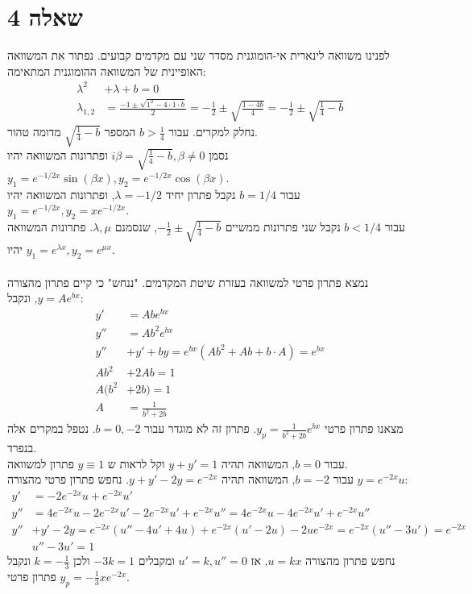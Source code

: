 \documentclass{article}
\begin{document}
\section*{שאלה 4}
לפנינו משוואה לינארית אי-הומוגנית מסדר שני עם מקדמים קבועים. נפתור את המשוואה האופיינית של המשוואה ההומוגנית המתאימה:
\begin{align*}
    \lambda^2     & +\lambda+b  =0                                                                                                           \\
    \lambda_{1,2} & =\frac{-1\pm\sqrt{1^2-4\cdot 1 \cdot b}}{2}=-\frac{1}{2}\pm \sqrt{\frac{1-4b}{4}} = -\frac{1}{2}\pm \sqrt{\frac{1}{4}-b}
\end{align*}
נחלק למקרים. עבור $b>\frac{1}{4}$ המספר $\sqrt{\frac{1}{4}-b}$ מדומה טהור. \\
נסמן $i\beta=\sqrt{\frac{1}{4}-b}, \beta\ne 0$ ופתרונות המשוואה יהיו $y_1=e^{-1/2x}\sin (\beta x), y_2=e^{-1/2x}\cos(\beta x)$. \\
עבור $b=1/4$ נקבל פתרון יחיד $\lambda=-1/2$, ופתרונות המשוואה יהיו $y_1=e^{-1/2x}, y_2=xe^{-1/2x}$. \\
עבור $b<1/4$ נקבל שני פתרונות ממשיים $-\frac{1}{2}\pm \sqrt{\frac{1}{4}-b}$, שנסמנם $\lambda, \mu$. פתרונות המשוואה יהיו $y_1=e^{\lambda x}, y_2=e^{\mu x}$.\\\\
נמצא פתרון פרטי למשוואה בעזרת שיטת המקדמים. "ננחש" כי קיים פתרון מהצורה $y=Ae^{bx}$, ונקבל:
\begin{align*}
    y'    & =Abe^{bx}                                \\
    y''   & =Ab^2e^{bx}                              \\
    y''   & +y'+by=e^{bx}(Ab^2+Ab+b\cdot A) = e^{bx} \\
    Ab^2  & +2Ab=1                                   \\
    A(b^2 & +2b)=1                                   \\
    A     & =\frac{1}{b^2+2b}
\end{align*}
מצאנו פתרון פרטי $y_p=\frac{1}{b^2+2b}e^{bx}$.
פתרון זה לא מוגדר עבור $b=0,-2$. נטפל במקרים אלה בנפרד. \\
עבור $b=0$, המשוואה תהיה $y+y'=1$ וקל לראות ש $y\equiv1$ פתרון למשוואה. \\
עבור $b=-2$, המשוואה תהיה $y+y'-2y=e^{-2x}$. נחפש פתרון פרטי מהצורה $y=e^{-2x}u$:
\begin{align*}
    y'  & =-2e^{-2x}u+e^{-2x}u'                                                          \\
    y'' & = 4e^{-2x}u-2e^{-2x}u'-2e^{-2x}u'+e^{-2x}u''=4e^{-2x}u-4e^{-2x}u'+e^{-2x}u''   \\
    y'' & +y'-2y = e^{-2x}(u''-4u'+4u)+e^{-2x}(u'-2u)-2ue^{-2x}=e^{-2x}(u''-3u')=e^{-2x} \\
        & u''-3u'=1
\end{align*}
נחפש פתרון מהצורה $u=kx$, אז $u'=k,u''=0$ ומקבלים $-3k=1$ ולכן $k=-\frac{1}{3}$
ונקבל פתרון פרטי $y_p=-\frac{1}{3}xe^{-2x}$.
\end{document}
